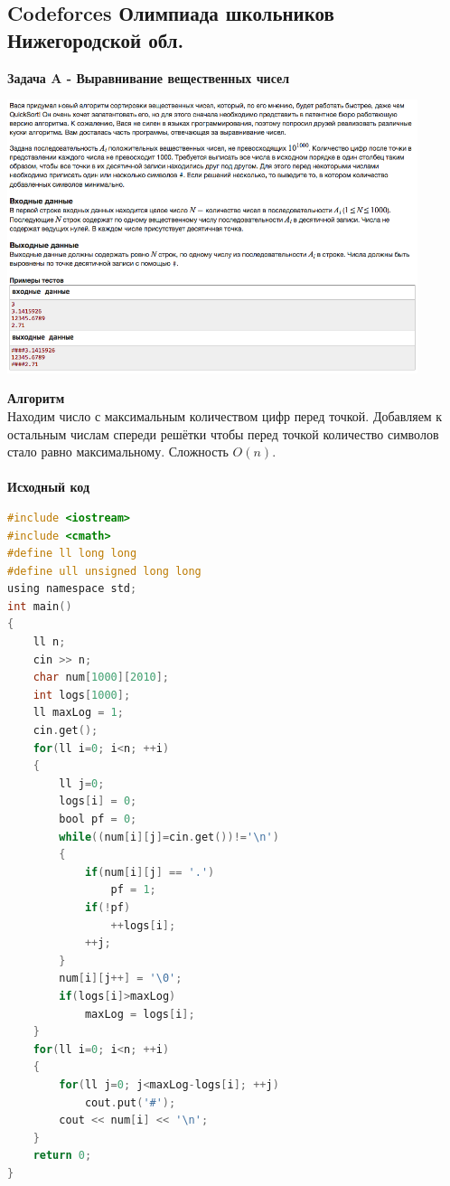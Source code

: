 \documentclass[a4paper,12pt]{article}
\begin{document}
%
%
\newpage
\subsection{Codeforces Олимпиада школьников Нижегородской обл.}

\textbf{{\large Задача A - Выравнивание вещественных чисел}} \\
\begin{center}
\includegraphics[width=0.9\textwidth]{CT_school_nn/CT_school_nn_A.png}\\ [1cm]
\end{center}
\textbf{{\large Алгоритм}} \\
Находим число с максимальным количеством цифр перед точкой. Добавляем к остальным числам спереди решётки чтобы перед точкой количество символов стало равно максимальному. Сложность $O(n)$. \\ 
\\
\textbf{{\large Исходный код}}
\begin{lstlisting}[language=C]
#include <iostream>
#include <cmath>
#define ll long long
#define ull unsigned long long
using namespace std;
int main()
{
    ll n;
    cin >> n;
    char num[1000][2010];
    int logs[1000];
    ll maxLog = 1;
    cin.get();
    for(ll i=0; i<n; ++i)
    {
        ll j=0;
        logs[i] = 0;
        bool pf = 0;
        while((num[i][j]=cin.get())!='\n')
        {
            if(num[i][j] == '.')
                pf = 1;
            if(!pf)
                ++logs[i];
            ++j;
        }
        num[i][j++] = '\0';
        if(logs[i]>maxLog)
            maxLog = logs[i];
    }
    for(ll i=0; i<n; ++i)
    {
        for(ll j=0; j<maxLog-logs[i]; ++j)
            cout.put('#');
        cout << num[i] << '\n';
    }
    return 0;
}
\end{lstlisting}
\end{document}
